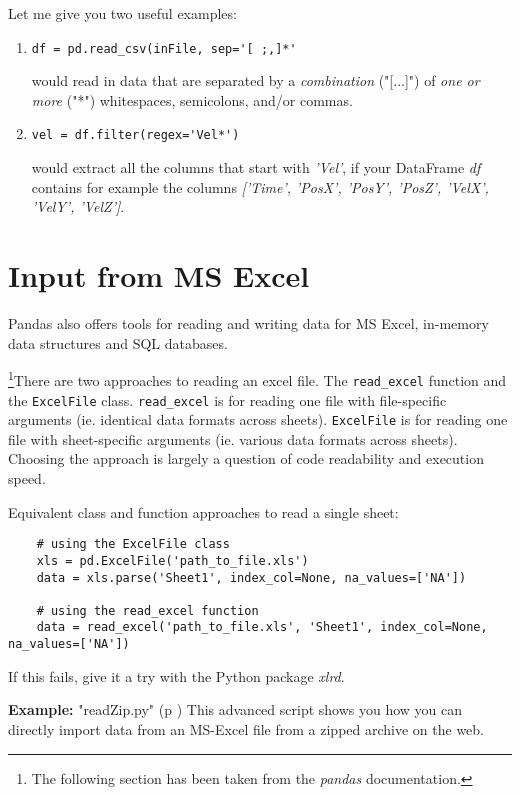 Let me give you two useful examples:

\begin{enumerate}
  \item \lstinline{df = pd.read_csv(inFile, sep='[ ;,]*'}

  would read in data that are separated by a \emph{combination} ("[...]") of \emph{one or more} ("*") whitespaces, semicolons, and/or commas.

  \item \lstinline{vel = df.filter(regex='Vel*')}

  would extract all the columns that start with \emph{'Vel'}, if your DataFrame \emph{df} contains for example the columns \emph{['Time', 'PosX', 'PosY', 'PosZ', 'VelX', 'VelY', 'VelZ']}.
\end{enumerate}

\section{Input from MS Excel}

Pandas also offers tools for reading and writing data for MS Excel, in-memory data structures and SQL databases. 

\footnote{The following section has been taken from the \emph{pandas} documentation.}There are two approaches to reading an excel file. The \lstinline{read_excel} function and the \lstinline{ExcelFile} class. \lstinline{read_excel} is for reading one file with file-specific arguments (ie. identical data formats across sheets). \lstinline{ExcelFile} is for reading one file with sheet-specific arguments (ie. various data formats across sheets). Choosing the approach is largely a question of code readability and execution speed.

Equivalent class and function approaches to read a single sheet:

\begin{lstlisting}
    # using the ExcelFile class
    xls = pd.ExcelFile('path_to_file.xls')
    data = xls.parse('Sheet1', index_col=None, na_values=['NA'])

    # using the read_excel function
    data = read_excel('path_to_file.xls', 'Sheet1', index_col=None, na_values=['NA'])
\end{lstlisting}
 
If this fails, give it a try with the Python package \emph{xlrd}.

\textbf{Example: }
\PyImg "readZip.py" (p \pageref{py:readZip}) This advanced script shows you how you can directly import data from an MS-Excel file from a zipped archive on the web.

